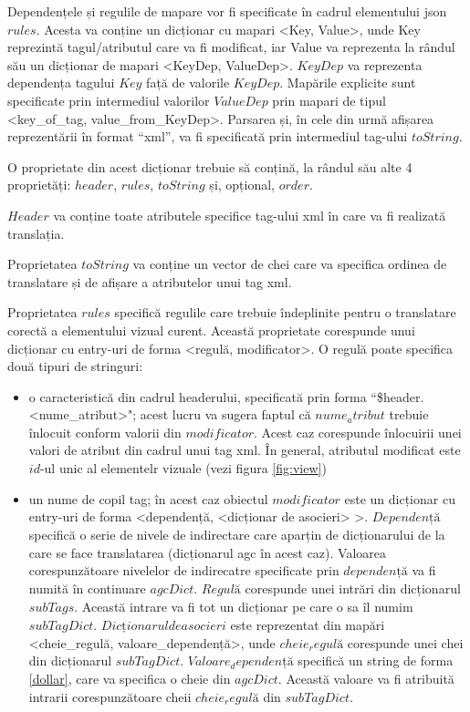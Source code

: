 Dependențele și regulile de mapare vor fi specificate în cadrul elementului json $rules$. Acesta va conține un dicționar cu mapari <Key, Value>, unde Key reprezintă tagul/atributul care va fi modificat, iar Value va reprezenta la rândul său un dicționar de mapari <KeyDep, ValueDep>.  $KeyDep$ va reprezenta dependența tagului $Key$ față de valorile $KeyDep$. Mapările explicite sunt specificate prin intermediul valorilor $ValueDep$ prin mapari de tipul <key_of_tag, value_from_KeyDep>. 
Parsarea și, în cele din urmă afișarea reprezentării în format “xml”, va fi specificată prin intermediul tag-ului $toString$. 

O proprietate din acest dicționar trebuie să conțină, la rândul său alte 4 proprietăți: $header$, $rules$, $toString$ și, opțional, $order$. 

$Header$ va conține toate atributele specifice tag-ului xml în care va fi realizată translația. 

Proprietatea $toString$ va conține un vector de chei care va specifica ordinea de translatare și de afișare a atributelor unui tag xml. 

Proprietatea $rules$ specifică regulile care trebuie îndeplinite pentru o translatare corectă a elementului vizual curent. Această proprietate corespunde unui dicționar cu entry-uri de forma <regulă, modificator>.
O regulă poate specifica două tipuri de stringuri:

\begin{itemize}  
\item o caracteristică din cadrul headerului, specificată prin forma ``\$header.<nume_atribut>"; acest lucru va sugera faptul că $nume_atribut$ trebuie înlocuit conform valorii  din $modificator$. Acest caz corespunde înlocuirii unei valori de atribut din cadrul unui tag xml. În general, atributul modificat este $id$-ul unic al elementelr vizuale (vezi figura \ref{fig:view})
\item un nume de copil tag; în acest caz obiectul $modificator$ este un dicționar cu entry-uri de forma <dependență, <dicționar de asocieri> >. $Dependență$ specifică o serie de nivele de indirectare care aparțin de dicționarului de la care se face translatarea (dicționarul agc în acest caz). Valoarea corespunzătoare nivelelor de indirecatre specificate prin $dependență$ va fi numită în continuare $agcDict$. $Regulă$ corespunde unei intrări din dicționarul $subTags$. Această intrare va fi tot un dicționar pe care o sa îl numim $subTagDict$. $Dicționarul de asocieri$ este reprezentat din mapări <cheie_regulă, valoare_dependență>, unde $cheie_regulă$ corespunde unei chei din dicționarul $subTagDict$. $Valoare_dependență$ specifică un string de forma \ref{dollar}, care va specifica o cheie din $agcDict$. Această valoare va fi atribuită intrarii corespunzătoare cheii $cheie_regulă$ din $subTagDict$. 
\end{itemize}
 
